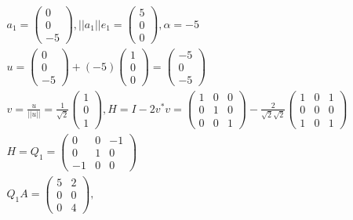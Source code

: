 \begin{gather*}
a_1 = \left( \begin{array}{cc}
0 \\
0\\
-5
\end{array} \right), 
||a_1|| e_1 = \left( \begin{array}{cc}
5 \\
0\\
0
\end{array} \right),
\alpha = -5 \\
u = \left( \begin{array}{cc}
0 \\
0\\
-5
\end{array} \right) +
(-5) 
\left( \begin{array}{cc}
1 \\
0\\
0
\end{array} \right) = 
\left( \begin{array}{cc}
-5 \\
0\\
-5
\end{array} \right)\\
v = \frac{u}{||u||} = \frac{1}{\sqrt{2}}\left( \begin{array}{cc}
1 \\
0\\
1
\end{array} \right),
H = I - 2 v^*v = \left( \begin{array}{ccc}
1 & 0 & 0 \\
0& 1 & 0\\
0 & 0 & 1
\end{array} \right) - 
\frac{2}{\sqrt{2}\sqrt{2}}
\left( \begin{array}{ccc}
1 & 0 & 1 \\
0& 0 & 0\\
1&0&1
\end{array} \right)\\
H = Q_1 = \left( \begin{array}{ccc}
0 & 0 & -1 \\
0 & 1 & 0\\
-1 & 0 & 0
\end{array} \right) \\
Q_1 A = \left( \begin{array}{cc}
5&2\\
0&0\\
0&4
\end{array} \right),
\end{gather*}
